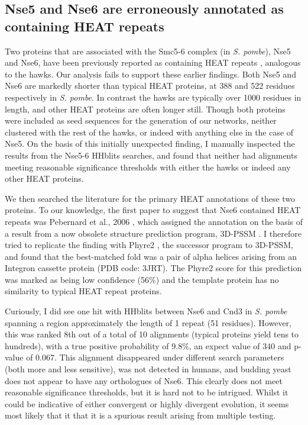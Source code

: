 \documentclass[a4paper,11pt,twoside,openright]{scrbook}
\begin{document}
\subsection{Nse5 and Nse6 are erroneously annotated as containing HEAT repeats}
Two proteins that are associated with the Smc5-6 complex (in \textit{S. pombe}),
Nse5 and Nse6, have been previously reported as containing HEAT repeats
\cite{Stephan2011,Palecek2015,Alt2017}, analogous to the hawks. Our analysis
fails to support these earlier findings. Both Nse5 and Nse6 are markedly shorter
than typical HEAT proteins, at 388 and 522 residues respectively in \textit{S.
pombe}. In contrast the hawks are typically over 1000 residues in length, and
other HEAT proteins are often longer still. Though both proteins were included
as seed sequences for the generation of our networks, neither clustered with the
rest of the hawks, or indeed with anything else in the case of Nse5. On the
basis of this initially unexpected finding, I manually inspected the results
from the Nse5-6 HHblits searches, and found that neither had alignments meeting
reasonable significance thresholds with either the hawks or indeed any other
HEAT proteins.

We then searched the literature for the primary HEAT annotations of these two
proteins. To our knowledge, the first paper to suggest that Nse6 contained HEAT
repeats was Pebernard et al., 2006 \cite{Pebernard2006}, which assigned the
annotation on the basis of a result from a now obsolete structure prediction
program, 3D-PSSM \cite{Kelley2000}. I therefore tried to replicate the finding
with Phyre2 \cite{Kelley2015}, the successor program to 3D-PSSM, and found that
the best-matched fold was a pair of alpha helices arising from an Integron
cassette protein (PDB code: 3JRT). The Phyre2 score for this prediction was
marked as being low confidence (56\%) and the template protein has no similarity
to typical HEAT repeat proteins.

Curiously, I did see one hit with HHblits between Nse6 and Cnd3 in \textit{S.
pombe} spanning a region approximately the length of 1 repeat (51 residues).
However, this was ranked 8th out of a total of 10 alignments (typical proteins
yield tens to hundreds), with a true positive probability of 9.8\%, an expect
value of 340 and p-value of 0.067. This alignment disappeared under different
search parameters (both more and less sensitive), was not detected in humans,
and budding yeast does not appear to have any orthologues of Nse6. This clearly
does not meet reasonable significance thresholds, but it is hard not to be
intrigued. Whilst it could be indicative of either convergent or highly
divergent evolution, it seems most likely that it that it is a spurious result
arising from multiple testing.
\end{document}
